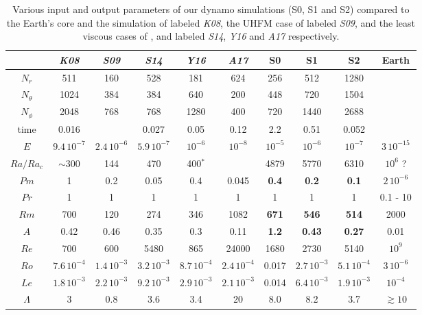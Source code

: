 \documentclass[12pt, a4paper]{article}
\begin{document}
\begin{table}
 \footnotesize
\begin{tabular}{c|ccccc|ccc|c}
     &  \textit{K08} & \textit{S09} & \textit{S14} & \textit{Y16} & \textit{A17} & \textbf{S0} & \textbf{S1} &  \textbf{S2} & Earth\\
\hline
$N_r$      & 511  & 160 & 528 & 181 & 624 & 256  & 512 &  1280 &  \\
$N_\theta$ & 1024 & 384 & 384 & 640 & 200 & 448  & 720  & 1504 &  \\
$N_\phi$   & 2048 & 768 & 768 & 1280 & 400 & 720 & 1440  & 2688 & \\
time & 0.016 & & 0.027 & 0.05 & 0.12 & 2.2 & 0.51 & 0.052 &  \\
\hline
$E$ &  $9.4\,10^{-7}$ & $2.4 \, 10^{-6}$ & $5.9 \, 10^{-7}$ & $10^{-6}$ & $10^{-8}$ & $10^{-5}$ & $10^{-6}$ & $10^{-7}$ & $3\,10^{-15}$ \\
$Ra/Ra_c$ & $\sim 300$ & 144 & 470 & 400$^*$ & & 4879 & 5770 & 6310 & $10^{6}$ ?\\ 
$Pm$ & 1 & 0.2 & 0.05 & 0.4 & 0.045 & \textbf{0.4} & \textbf{0.2} & \textbf{0.1} & $2\, 10^{-6}$\\
$Pr$ & 1 & 1 & 1 & 1 & 1 & 1 & 1 & 1 & 0.1 - 10 \\
\hline
$Rm$ &  700 & 120 & 274 & 346 & 1082 & \textbf{671} & \textbf{546} & \textbf{514}  & 2000 \\
$A$  &  0.42 & 0.46 & 0.35 &  0.3 & 0.11 & \textbf{1.2} & \textbf{0.43} & \textbf{0.27} & 0.01\\ 
$Re$ &  700 & 600 & 5480 & 865 & 24000 & 1680 & 2730 & 5140 & $10^9$\\
$Ro$ & $7.6\,10^{-4}$ & $1.4\,10^{-3}$ & $3.2\,10^{-3}$ & $8.7\,10^{-4}$ & $2.4\,10^{-4}$ & 0.017  & $2.7\,10^{-3}$ & $5.1\,10^{-4}$ & $3\, 10^{-6}$ \\
$Le$ &  $1.8\,10^{-3}$ & $2.2\,10^{-3}$ &$9.2\,10^{-3}$ & $2.9\,10^{-3}$ & $2.1\,10^{-3}$ & 0.014 & $6.4\,10^{-3}$ & $1.9\,10^{-3}$ & $10^{-4}$\\
$\Lambda$ & 3 & 0.8 & 3.6 & 3.4 & 20 & 8.0 & 8.2 & 3.7 & $\gtrsim 10$
\end{tabular}
\caption{Various input and output parameters of our dynamo simulations (S0, S1 and S2) compared to the Earth's core and the simulation of \citet{kageyama2008} labeled \textit{K08}, the UHFM case of \citet{sakuraba2009} labeled \textit{S09}, and the least viscous cases of \citet{sheyko2014phd}, \citet{yadav2016b} and \citet{aubert2017} labeled \textit{S14}, \textit{Y16} and \textit{A17} respectively.
}
\end{table}
\end{document}
